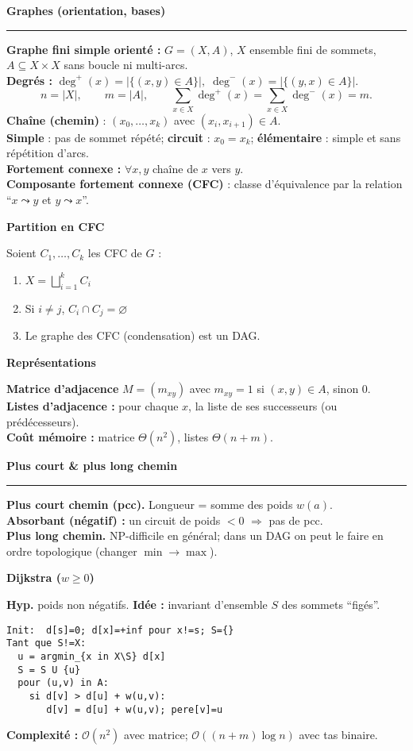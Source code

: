 \documentclass[9pt,a4paper]{article}
\newcommand{\bigO}{\mathcal{O}}
\newcommand{\sect}[1]{\vspace{1ex}\textbf{\large #1}\par\vspace{0.3ex}\hrule\vspace{0.6ex}}
\newcommand{\subsect}[1]{\vspace{0.4ex}\textbf{#1}\par}
\begin{document}
\newpage
\begin{multicols}{3}
    \sloppy\raggedcolumns
    \scriptsize

    \sect{Graphes (orientation, bases)}
    \textbf{Graphe fini simple orienté :} $G=(X,A)$, $X$ ensemble fini de sommets, $A\subseteq X\times X$ sans boucle ni multi-arcs.\\
    \textbf{Degrés :} $\deg^+(x)=|\{(x,y)\in A\}|,\;\deg^-(x)=|\{(y,x)\in A\}|.$
    \[
        n=|X|,\qquad m=|A|,\qquad \sum_{x\in X}\deg^+(x)=\sum_{x\in X}\deg^-(x)=m.
    \]
    \textbf{Chaîne (chemin)} : $(x_0,\ldots,x_k)$ avec $(x_i,x_{i+1})\in A$.\\
    \textbf{Simple} : pas de sommet répété; \textbf{circuit} : $x_0=x_k$; \textbf{élémentaire} : simple et sans répétition d’arcs.\\
    \textbf{Fortement connexe :} $\forall x,y$ chaîne de $x$ vers $y$. \\
    \textbf{Composante fortement connexe (CFC)} : classe d’équivalence par la relation “$x\leadsto y$ et $y\leadsto x$”.

    \subsect{Partition en CFC}
    Soient $C_1,\ldots,C_k$ les CFC de $G$ :
    \begin{enumerate}
        \item $X=\bigsqcup_{i=1}^k C_i$
        \item Si $i\ne j$, $C_i\cap C_j=\varnothing$
        \item Le graphe des CFC (condensation) est un DAG.
    \end{enumerate}

    \subsect{Représentations}
    \textbf{Matrice d’adjacence} $M=(m_{xy})$ avec $m_{xy}=1$ si $(x,y)\in A$, sinon $0$.\\
    \textbf{Listes d’adjacence :} pour chaque $x$, la liste de ses successeurs (ou prédécesseurs). \\
    \textbf{Coût mémoire :} matrice $\Theta(n^2)$, listes $\Theta(n+m)$.

    \sect{Plus court \& plus long chemin}
    \textbf{Plus court chemin (pcc).} Longueur = somme des poids $w(a)$.\\
    \textbf{Absorbant (négatif) :} un circuit de poids $<0$ $\Rightarrow$ pas de pcc.\\
    \textbf{Plus long chemin.} NP-difficile en général; dans un DAG on peut le faire en ordre topologique (changer $\min\to\max$).

    \subsect{Dijkstra ($w\ge 0$)}
    \textbf{Hyp.} poids non négatifs. \textbf{Idée :} invariant d’ensemble $S$ des sommets “figés”.
    \begin{lstlisting}[style=tight]
Init:  d[s]=0; d[x]=+inf pour x!=s; S={}
Tant que S!=X:
  u = argmin_{x in X\S} d[x]
  S = S U {u}
  pour (u,v) in A:
    si d[v] > d[u] + w(u,v):
       d[v] = d[u] + w(u,v); pere[v]=u
\end{lstlisting}
    \textbf{Complexité :} $\bigO(n^2)$ avec matrice; $\bigO((n+m)\log n)$ avec tas binaire.


\end{multicols}
\end{document}
